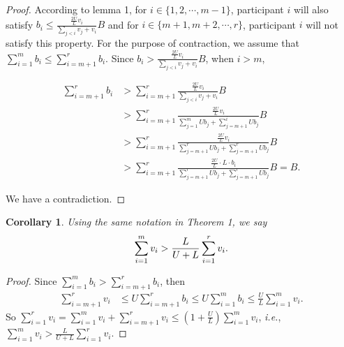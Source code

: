 \documentclass[10pt,journal,letterpaper,compsoc]{IEEEtran}
\newtheorem{corollary}{Corollary}
\newcommand{\ie}{{\em i.e.}}
\begin{document}
\begin{proof}
According to lemma 1, for $i \in \{1,2,\cdots, m-1\}$, participant $i$ will also satisfy $b_i \le \frac{\frac{2U}{L}v_i}{\sum_{j<i}v_j+v_i}B$ and for $i \in \{m+1,m+2,\cdots, r\}$, participant $i$ will not satisfy this property. For the purpose of contraction, we assume that $\sum_{i=1}^{m} b_i \le \sum_{i=m+1}^{r}b_i$. Since $b_i > \frac{\frac{2U}{L}v_i}{\sum_{j<i}v_j+v_i}B$, when $i > m$,
\begin{small}
\begin{align}
\nonumber \sum_{i=m+1}^{r}b_i  &> \sum_{i=m+1}^{r}\frac{\frac{2U}{L}v_i}{\sum_{j<i}v_j+v_i}B \\
\nonumber &> \sum_{i=m+1}^{r}\frac{\frac{2U}{L}v_i}{\sum_{j=1}^{m}Ub_j+\sum_{j=m+1}^{i}Ub_j}B \\
\nonumber &> \sum_{i=m+1}^{r}\frac{\frac{2U}{L}v_i}{\sum_{j=m+1}^{r}Ub_j+\sum_{j=m+1}^{r}Ub_j}B \\
\nonumber &> \sum_{i=m+1}^{r}\frac{\frac{2U}{L} \cdot L \cdot b_i}{\sum_{j=m+1}^{r}Ub_j+\sum_{j=m+1}^{r}Ub_j}B = B .
\end{align}
\end{small}
We have a contradiction.
\end{proof}

\begin{corollary}
Using the same notation in Theorem 1, we say
\begin{equation}
\sum_{i=1}^{m} v_i > \frac{L}{U+L}\sum_{i=1}^{r} v_i. \notag
\end{equation}
\end{corollary}


\begin{proof}
Since  $\sum_{i=1}^{m} b_i > \sum_{i=m+1}^{r}b_i$, then
\begin{align}
\nonumber \sum_{i=m+1}^{r} v_i &\le U\sum_{i=m+1}^{r} b_i  \le U\sum_{i=1}^{m} b_i \le \frac{U}{L}\sum_{i=1}^{m} v_i.
\end{align}
So $\sum_{i=1}^{r} v_i = \sum_{i=1}^{m} v_i + \sum_{i=m+1}^{r} v_i \le (1+\frac{U}{L})\sum_{i=1}^{m} v_i$, \ie, $\sum_{i=1}^{m} v_i > \frac{L}{U+L}\sum_{i=1}^{r} v_i$.
\end{proof}
\end{document}
